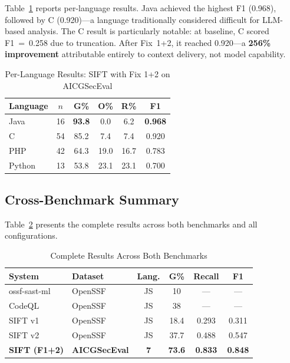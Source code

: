 \documentclass[conference]{IEEEtran}
\begin{document}
Table~\ref{tab_perlang} reports per-language results. Java achieved the highest F1 (0.968), followed by C (0.920)---a language traditionally considered difficult for LLM-based analysis. The C result is particularly notable: at baseline, C scored F1~=~0.258 due to truncation. After Fix~1+2, it reached 0.920---a \textbf{256\% improvement} attributable entirely to context delivery, not model capability.

\begin{table}[htbp]
\caption{Per-Language Results: SIFT with Fix 1+2 on AICGSecEval}
\begin{center}
\begin{tabular}{|l|c|c|c|c|c|}
\hline
\textbf{Language} & $n$ & \textbf{G\%} & \textbf{O\%} & \textbf{R\%} & \textbf{F1} \\
\hline
Java & 16 & \textbf{93.8} & 0.0 & 6.2 & \textbf{0.968} \\
\hline
C & 54 & 85.2 & 7.4 & 7.4 & 0.920 \\
\hline
PHP & 42 & 64.3 & 19.0 & 16.7 & 0.783 \\
\hline
Python & 13 & 53.8 & 23.1 & 23.1 & 0.700 \\
\hline
\end{tabular}
\label{tab_perlang}
\end{center}
\end{table}

\subsection{Cross-Benchmark Summary}

Table~\ref{tab_crossbench} presents the complete results across both benchmarks and all configurations.

\begin{table}[htbp]
\caption{Complete Results Across Both Benchmarks}
\begin{center}
\begin{tabular}{|l|l|c|c|c|c|}
\hline
\textbf{System} & \textbf{Dataset} & \textbf{Lang.} & \textbf{G\%} & \textbf{Recall} & \textbf{F1} \\
\hline
ossf-sast-ml & OpenSSF & JS & 10 & --- & --- \\
\hline
CodeQL & OpenSSF & JS & 38 & --- & --- \\
\hline
SIFT v1 & OpenSSF & JS & 18.4 & 0.293 & 0.311 \\
\hline
SIFT v2 & OpenSSF & JS & 37.7 & 0.488 & 0.547 \\
\hline
\textbf{SIFT (F1+2)} & \textbf{AICGSecEval} & \textbf{7} & \textbf{73.6} & \textbf{0.833} & \textbf{0.848} \\
\hline
\end{tabular}
\label{tab_crossbench}
\end{center}
\end{table}
\end{document}
